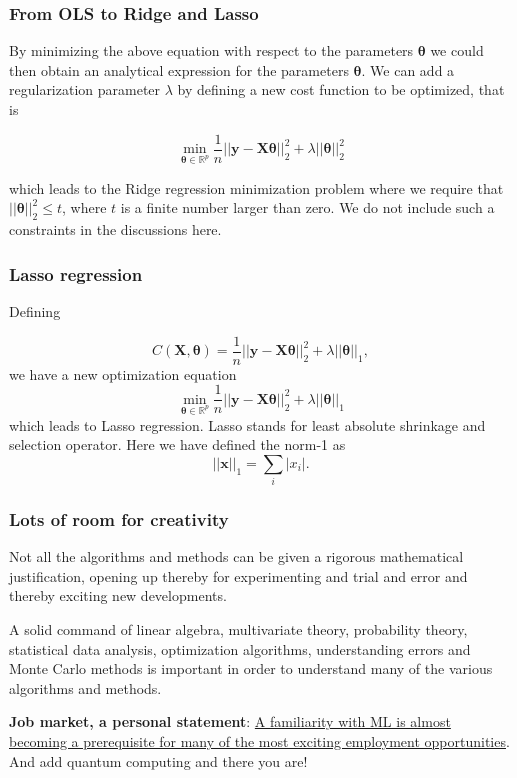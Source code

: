 \documentclass{beamer}
\begin{document}
\begin{frame}
\frametitle{From OLS to Ridge and Lasso}

By minimizing the above equation with respect to the parameters
$\bm{\theta}$ we could then obtain an analytical expression for the
parameters $\bm{\theta}$.  We can add a regularization parameter $\lambda$ by
defining a new cost function to be optimized, that is

\[
{\displaystyle \min_{\bm{\theta}\in
{\mathbb{R}}^{p}}}\frac{1}{n}\vert\vert \bm{y}-\bm{X}\bm{\theta}\vert\vert_2^2+\lambda\vert\vert \bm{\theta}\vert\vert_2^2
\]

which leads to the Ridge regression minimization problem where we
require that $\vert\vert \bm{\theta}\vert\vert_2^2\le t$, where $t$ is
a finite number larger than zero. We do not include such a constraints in the discussions here.
\end{frame}

\begin{frame}
\frametitle{Lasso regression}

Defining

\[
C(\bm{X},\bm{\theta})=\frac{1}{n}\vert\vert \bm{y}-\bm{X}\bm{\theta}\vert\vert_2^2+\lambda\vert\vert \bm{\theta}\vert\vert_1,
\]
we have a new optimization equation
\[
{\displaystyle \min_{\bm{\theta}\in
{\mathbb{R}}^{p}}}\frac{1}{n}\vert\vert \bm{y}-\bm{X}\bm{\theta}\vert\vert_2^2+\lambda\vert\vert \bm{\theta}\vert\vert_1
\]
which leads to Lasso regression. Lasso stands for least absolute shrinkage and selection operator. 
Here we have defined the norm-1 as 
\[
\vert\vert \bm{x}\vert\vert_1 = \sum_i \vert x_i\vert. 
\]
\end{frame}

\begin{frame}
\frametitle{Lots of room for creativity}

\begin{block}{}
Not all the
algorithms and methods can be given a rigorous mathematical
justification, opening up thereby for experimenting
and trial and error and thereby exciting new developments. 
\end{block}

\begin{block}{}
A solid command of linear algebra, multivariate theory, 
probability theory, statistical data analysis, optimization algorithms, 
understanding errors and Monte Carlo methods is important in order to understand many of the 
various algorithms and methods. 
\end{block}

\textbf{Job market, a personal statement}: \href{{https://www.analyticsindiamag.com/top-countries-hiring-most-number-of-artificial-intelligence-machine-learning-experts/}}{A familiarity with ML is almost becoming a prerequisite for many of the most exciting employment opportunities}. And add quantum computing and there you are!
\end{frame}
\end{document}

